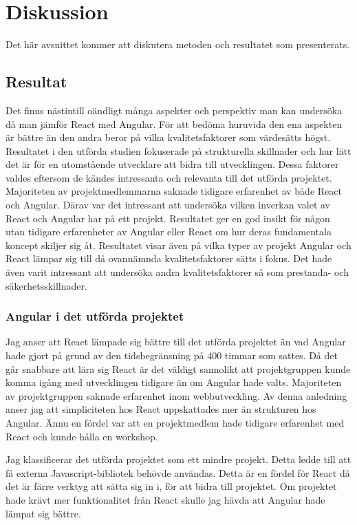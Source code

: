 \section{Diskussion}
\label{sec:axel-discussion}
Det här avsnittet kommer att diskutera metoden och resultatet som presenterats. 

\subsection{Resultat}
\label{subsec:axel-discussion-results}
Det finns nästintill oändligt många aspekter och perspektiv man kan undersöka då man jämför React med Angular. För att bedöma huruvida den ena aspekten är bättre än den andra beror på vilka kvalitetsfaktorer som värdesätts högst. Resultatet i den utförda studien fokuserade på strukturella skillnader och hur lätt det är för en utomstående utvecklare att bidra till utvecklingen. Dessa faktorer valdes eftersom de kändes intressanta och relevanta till det utförda projektet. Majoriteten av projektmedlemmarna saknade tidigare erfarenhet av både React och Angular. Därav var det intressant att undersöka vilken inverkan valet av React och Angular har på ett projekt. Resultatet ger en god insikt för någon utan tidigare erfarenheter av Angular eller React om hur deras fundamentala koncept skiljer sig åt. Resultatet visar även på vilka typer av projekt Angular och React lämpar sig till då ovannämnda kvalitetsfaktorer sätts i fokus. Det hade även varit intressant att undersöka andra kvalitetsfaktorer så som prestanda- och säkerhetsskillnader.

\subsubsection{Angular i det utförda projektet}
Jag anser att React lämpade sig bättre till det utförda projektet än vad Angular hade gjort på grund av den tidsbegränsning på 400 timmar som sattes. Då det går snabbare att lära sig React är det väldigt sannolikt att projektgruppen kunde komma igång med utvecklingen tidigare än om Angular hade valts. Majoriteten av projektgruppen saknade erfarenhet inom webbutveckling. Av denna anledning anser jag att simpliciteten hos React uppskattades mer än strukturen hos Angular. Ännu en fördel var att en projektmedlem hade tidigare erfarenhet med React och kunde hålla en workshop. 

Jag klassificerar det utförda projektet som ett mindre projekt. Detta ledde till att få externa Javascript-bibliotek behövde användas. Detta är en fördel för React då det är färre verktyg att sätta sig in i, för att bidra till projektet. Om projektet hade krävt mer funktionalitet från React skulle jag hävda att Angular hade lämpat sig bättre.

